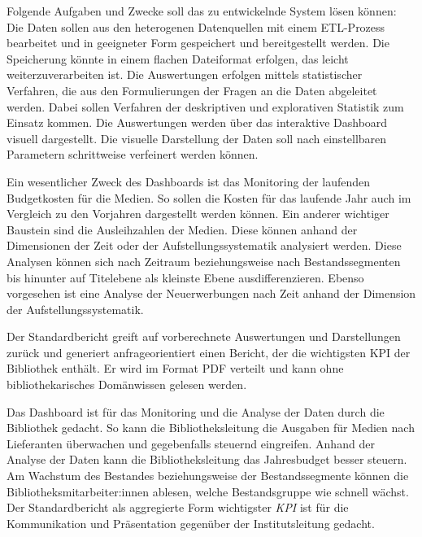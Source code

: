 Folgende Aufgaben und Zwecke soll das zu entwickelnde System lösen können:
Die Daten sollen aus den heterogenen Datenquellen mit einem \acrfull{ETL}-Prozess bearbeitet und in
geeigneter Form gespeichert und bereitgestellt werden. Die Speicherung könnte in einem flachen Dateiformat erfolgen, das leicht
weiterzuverarbeiten ist. Die Auswertungen erfolgen mittels statistischer Verfahren, 
die aus den Formulierungen der Fragen an die Daten abgeleitet werden. Dabei sollen Verfahren der deskriptiven und explorativen Statistik zum Einsatz kommen.
Die Auswertungen werden über das interaktive Dashboard visuell dargestellt.
Die visuelle Darstellung der Daten soll nach einstellbaren Parametern schrittweise verfeinert werden können.

Ein wesentlicher Zweck des Dashboards ist das Monitoring der laufenden Budgetkosten für die Medien. So sollen die Kosten für das laufende Jahr auch im Vergleich zu den
Vorjahren dargestellt werden können. Ein anderer wichtiger Baustein sind die Ausleihzahlen der Medien. Diese können
anhand der Dimensionen der Zeit oder der Aufstellungssystematik analysiert werden. Diese Analysen können sich 
nach Zeitraum beziehungsweise nach Bestandssegmenten bis hinunter auf Titelebene als kleinste Ebene ausdifferenzieren. 
Ebenso vorgesehen ist eine Analyse der Neuerwerbungen nach Zeit anhand der Dimension der Aufstellungssystematik.

Der Standardbericht greift auf vorberechnete Auswertungen und Darstellungen zurück und generiert anfrageorientiert einen Bericht, der die wichtigsten 
\acrfull{KPI} der Bibliothek enthält. Er wird im Format PDF verteilt und kann ohne bibliothekarisches Domänwissen gelesen werden.

Das Dashboard ist für das Monitoring und die Analyse der Daten durch die Bibliothek gedacht. 
So kann die Bibliotheksleitung die Ausgaben für Medien nach Lieferanten überwachen und gegebenfalls steuernd eingreifen.
Anhand der Analyse der Daten kann die Bibliotheksleitung das Jahresbudget besser steuern.
Am Wachstum des Bestandes beziehungsweise der Bestandssegmente können die Bibliotheksmitarbeiter:innen ablesen, welche Bestandsgruppe
wie schnell wächst.
Der Standardbericht als aggregierte Form wichtigster \textit{\acrshort{KPI}} ist für die Kommunikation und Präsentation gegenüber der Institutsleitung gedacht.

